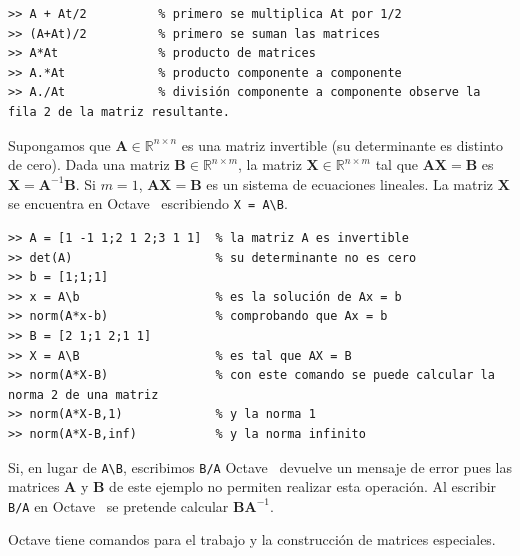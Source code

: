 \documentclass[letter,11pt]{article}
\newcommand\R{\mathbb{R}}
\newcommand\0{\mathbf{0}}
\newcommand{\octave}{{\sc Octave }}
\begin{document}
\begin{lstlisting}
>> A + At/2          % primero se multiplica At por 1/2
>> (A+At)/2          % primero se suman las matrices
>> A*At              % producto de matrices
>> A.*At             % producto componente a componente
>> A./At             % división componente a componente observe la fila 2 de la matriz resultante.
\end{lstlisting}

\medskip
	
	Supongamos que $\boldsymbol{A} \in \R^{n\times n}$ es una matriz invertible (su determinante
	es distinto de cero). Dada una matriz $\boldsymbol{B} \in \R^{n\times m}$,
	la matriz $\boldsymbol{X} \in \R^{n\times m}$
	tal que $\boldsymbol{AX} = \boldsymbol{B}$ es $\boldsymbol{X} = \boldsymbol{A}^{-1}\boldsymbol{B}$. Si $m = 1$, $\boldsymbol{AX} = \boldsymbol{B}$ es
	un sistema de ecuaciones lineales.
	La matriz $\boldsymbol{X}$ se encuentra en \octave\, escribiendo \Verb+X = A\B+.
	
    \medskip

\begin{lstlisting}
>> A = [1 -1 1;2 1 2;3 1 1]  % la matriz A es invertible
>> det(A)                    % su determinante no es cero
>> b = [1;1;1]
>> x = A\b                   % es la solución de Ax = b
>> norm(A*x-b)               % comprobando que Ax = b
>> B = [2 1;1 2;1 1]
>> X = A\B                   % es tal que AX = B
>> norm(A*X-B)               % con este comando se puede calcular la norma 2 de una matriz
>> norm(A*X-B,1)             % y la norma 1
>> norm(A*X-B,inf)           % y la norma infinito
\end{lstlisting}				
	
	\medskip

	Si, en lugar de \Verb+A\B+, escribimos \Verb+B/A+ \octave\, devuelve un mensaje
	de error pues las matrices $\boldsymbol{A}$ y $\boldsymbol{B}$ de este ejemplo no permiten
	realizar esta operaci\'on. Al escribir
	\Verb+B/A+ en \octave\, se pretende calcular $\boldsymbol{BA}^{-1}$.

\medskip

\octave tiene comandos para el trabajo y la construcci\'on de matrices especiales.

\medskip
\end{document}
